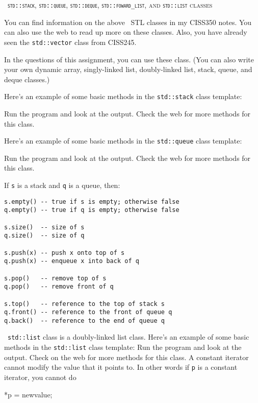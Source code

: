 \textsc{\cpp\
\textnormal{\texttt{std::stack}},
\textnormal{\texttt{std::queue}},
\textnormal{\texttt{std::deque}},
\textnormal{\texttt{std::foward\_list}},
and
\textnormal{\texttt{std::list}} classes}

You can find information on the above \cpp\ STL classes in my CISS350 notes.
You can also use the web to read up more on these classes.
Also, you have already seen the \verb!std::vector! class from CISS245.

In the questions of this assignment, you can use these class.
(You can also write your own dynamic array, singly-linked list,
doubly-linked list, stack, queue, and deque classes.)

Here's an example of some basic methods in the \verb!std::stack! class
template:
{\small
{}
}

Run the program and look at the output.
Check the web for more methods for this class.

Here's an example of some basic methods in the \verb!std::queue! class
template:
{\small
{}
}

Run the program and look at the output.
Check the web for more methods for this class.

If \verb!s! is a stack and \verb!q! is a queue, then:
{\small
\begin{Verbatim}[frame=single,fontsize=\footnotesize]
s.empty() -- true if s is empty; otherwise false
q.empty() -- true if q is empty; otherwise false

s.size()  -- size of s
q.size()  -- size of q

s.push(x) -- push x onto top of s
q.push(x) -- enqueue x into back of q

s.pop()   -- remove top of s
q.pop()   -- remove front of q

s.top()   -- reference to the top of stack s
q.front() -- reference to the front of queue q
q.back()  -- reference to the end of queue q
\end{Verbatim}
}

\cpp\ \verb!std::list! class is a doubly-linked list class.
Here's an example of some basic methods in the \verb!std::list! class
template:
{\small
{}
}
Run the program and look at the output.
Check on the web for more methods for this class.
A constant iterator cannot modify the value that it points to.
In other words if \verb$p$ is a constant iterator, you cannot do
\begin{console}[fontsize=\footnotesize]
*p = newvalue;
\end{console}

